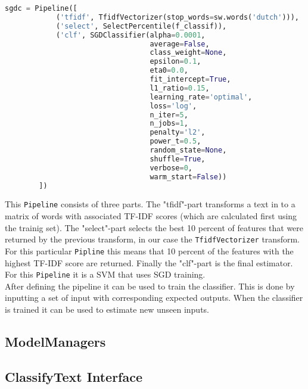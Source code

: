 \begin{lstlisting}[language=python, caption={SGDC Pipeline}, label={lst:sdgc}]
sgdc = Pipeline([
            ('tfidf', TfidfVectorizer(stop_words=sw.words('dutch'))),
            ('select', SelectPercentile(f_classif)),
            ('clf', SGDClassifier(alpha=0.0001,
                                  average=False,
                                  class_weight=None,
                                  epsilon=0.1,
                                  eta0=0.0,
                                  fit_intercept=True,
                                  l1_ratio=0.15,
                                  learning_rate='optimal',
                                  loss='log',
                                  n_iter=5,
                                  n_jobs=1,
                                  penalty='l2',
                                  power_t=0.5,
                                  random_state=None,
                                  shuffle=True,
                                  verbose=0,
                                  warm_start=False))
        ])
\end{lstlisting}
This \texttt{Pipeline} consists of three parts. The "tfidf"-part transforms a text in to a matrix of words with associated TF-IDF scores (which are calculated first using the trainig set). The "select"-part selects the best 10 percent of features that were returned by the previous transform, in our case the \texttt{TfidfVectorizer} transform. For this particular \texttt{Pipline} this means that 10 percent of the features with the highest TF-IDF score are returned. Finally the "clf"-part is the final estimator. For this \texttt{Pipeline} it is a SVM that uses SGD training.\\
After defining the pipeline it can be used to train the classifier. This is done by inputting a set of input with corresponding expected outputs. When the classifier is trained it can be used to estimate new unseen inputs. 
\subsection{ModelManagers}

\subsection{ClassifyText Interface}
